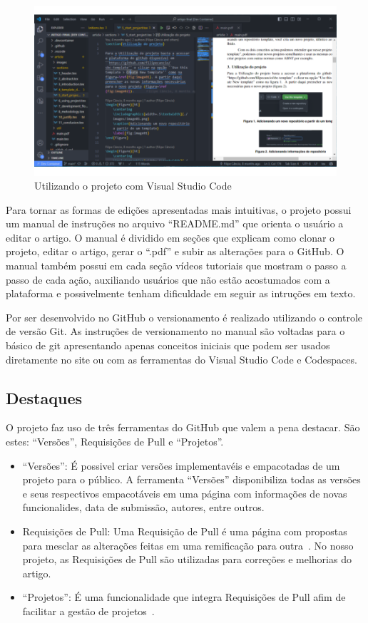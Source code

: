 \begin{itemize}
	\begin{figure}[H]
		\centering
		\includegraphics[width=.6\textwidth]{./images/fig01.png}
		\caption{Utilizando o projeto com Visual Studio Code}
		\label{fig:fig03}
	\end{figure}
\end{itemize}

Para tornar as formas de edições apresentadas mais intuitivas, o projeto possui um manual de instruções no arquivo ``README.md'' que orienta o usuário a editar o artigo. O manual é dividido em seções que explicam como clonar o projeto, editar o artigo, gerar o ``.pdf'' e subir as alterações para o GitHub. O manual também possui em cada seção vídeos tutoriais que mostram o passo a passo de cada ação, auxiliando usuários que não estão acostumados com a plataforma e possivelmente tenham dificuldade em seguir as intruções em texto.

Por ser desenvolvido no GitHub o versionamento é realizado utilizando o controle de versão Git. As instruções de versionamento no manual são voltadas para o básico de git apresentando apenas conceitos iniciais que podem ser usados diretamente no site ou com as ferramentas do Visual Studio Code e Codespaces.

\subsection{Destaques}
O projeto faz uso de três ferramentas do GitHub que valem a pena destacar. São estes: ``Versões'', Requisições de Pull e ``Projetos''.
\begin{itemize}
	\item ``Versões'': É possivel criar versões implementavéis e empacotadas de um projeto para o público. A ferramenta ``Versões'' disponibiliza todas as versões e seus respectivos empacotáveis em uma página com informações de novas funcionalides, data de submissão, autores, entre outros.~\cite{github:03}
	\item Requisições de Pull: Uma Requisição de Pull é uma página com propostas para mesclar as alterações feitas em uma remificação para outra~\cite{github:04}. No nosso projeto, as Requisições de Pull são utilizadas para correções e melhorias do artigo.
	\item ``Projetos'': É uma funcionalidade que integra Requisições de Pull afim de facilitar a gestão de projetos~\cite{github:05}.
\end{itemize}


